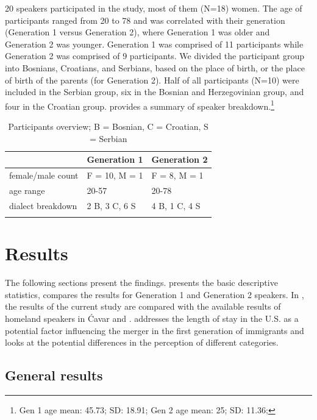 \documentclass[output=paper,modfonts,nonflat,
]{langsci/langscibook}
\begin{document}
20 speakers participated in the study, most of them (N=18) women. The age of participants ranged from 20 to 78 and was correlated with their generation (Generation 1 versus Generation 2), where Generation 1 was older and Generation 2 was younger. Generation 1 was comprised of 11 participants while Generation 2 was comprised of 9 participants. We divided the participant group into Bosnians, Croatians, and Serbians, based on the place of birth, or the place of birth of the parents (for Generation 2). Half of all participants (N=10) were included in the Serbian group, six in the Bosnian and Herzegovinian group, and four in the Croatian group.  provides a summary of speaker breakdown.\footnote{Gen 1 age mean: 45.73; SD: 18.91; Gen 2 age mean: 25; SD: 11.36;}


\begin{table}
\begin{tabularx}{\textwidth}{XXl}
\lsptoprule
&  Generation 1 &  Generation 2\\
\midrule
female/male count & F = 10, M = 1 & F = 8, M = 1\\
age range & 20-57 & 20-78\\
dialect breakdown & 2 B, 3 C, 6 S & 4 B, 1 C, 4 S\\
\lspbottomrule
\end{tabularx}
\caption{\label{tab:mihajlovic:4} Participants overview; B = Bosnian, C = Croatian, S = Serbian}
\end{table}

\section{Results}\label{sec:mihajlovic:5}

The following sections present the findings.  presents the basic descriptive statistics,  compares the results for Generation 1 and Generation 2 speakers. In , the results of the current study are compared with the available results of homeland speakers in Ćavar and \citet{Hamann2011}.  addresses the length of stay in the U.S. as a potential factor influencing the merger in the first generation of immigrants and  looks at the potential differences in the perception of different categories.


\subsection{General results}\label{sec:mihajlovic:5.1}
\end{document}
